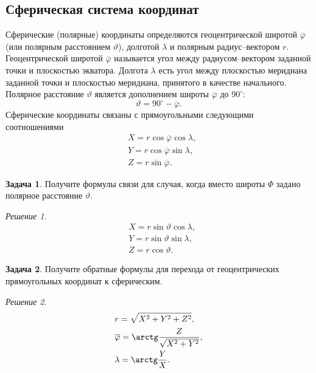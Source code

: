 \documentclass[11pt, a4paper]{article}
\theoremstyle{plain}
\theoremstyle{definition}
\newtheorem{problem}{Задача}[section]
\theoremstyle{remark}
\newtheorem*{solution}{Решение}
\renewcommand{\phi}{\ensuremath{\varphi}}
\renewcommand{\theta}{\vartheta}
\begin{document}
\subsection{Сферическая система координат}

Сферические (полярные) координаты определяются геоцентрической широтой $\overline{\phi}$ (или полярным
расстоянием $\theta$), долготой $\lambda$ и полярным радиус--вектором $r$.
Геоцентрической широтой $\overline{\phi}$ называется угол между радиусом--вектором заданной точки и плоскостью
экватора.
Долгота $\lambda$ есть угол между
плоскостью меридиана заданной точки и плоскостью меридиана, принятого в качестве начального.
Полярное расстояние $\theta$ является дополнением широты $\overline{\phi}$ до $90^\circ$:
\begin{equation*}
    \theta = 90^\circ - \overline{\phi}.
\end{equation*}
Сферические координаты связаны с прямоугольными следующими соотношениями
\begin{align*}
    &X = r\cos\overline{\phi}\cos\lambda,\\
    &Y = r\cos\overline{\phi}\sin\lambda,\\
    &Z = r\sin\overline{\phi}.
\end{align*}
\begin{problem}
Получите формулы связи для случая, когда вместо широты $\Phi$ задано полярное расстояние $\theta$.
\end{problem}
\begin{solution}
\begin{align*}
    &X = r\sin\theta\cos\lambda,\\
    &Y = r\sin\theta\sin\lambda,\\
    &Z = r\cos\theta.
\end{align*}
\end{solution}
\begin{problem}
    Получите обратные формулы для перехода от геоцентрических прямоугольных координат к сферическим.
\end{problem}
\begin{solution}
\begin{align*}
    &r = \sqrt{X^2 + Y^2 + Z^2},\\
    &\overline{\phi} = \arctg\dfrac{Z}{\sqrt{X^2 + Y^2}},\\
    &\lambda = \arctg\dfrac{Y}{X}.
\end{align*}
\end{solution}
\end{document}
